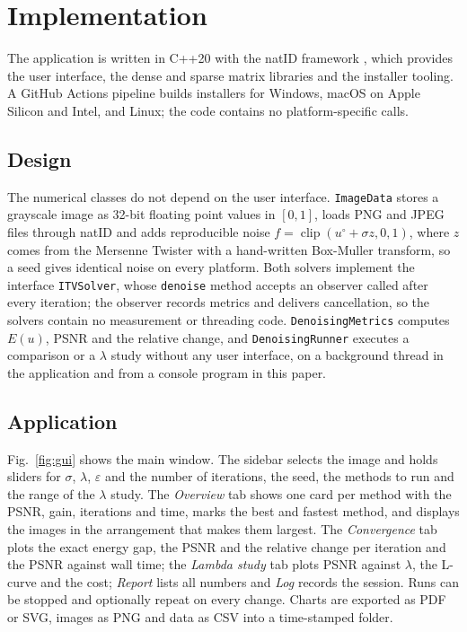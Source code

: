 \documentclass[conference,a4paper]{IEEEtran}
\DeclareMathOperator{\clip}{clip}
\begin{document}
\section{Implementation}\label{sec:impl}

The application is written in C++20 with the natID framework \cite{natid}, which provides the user interface, the dense and sparse matrix libraries and the installer tooling. A GitHub Actions pipeline builds installers for Windows, macOS on Apple Silicon and Intel, and Linux; the code contains no platform-specific calls.

\subsection{Design}

The numerical classes do not depend on the user interface. \texttt{ImageData} stores a grayscale image as 32-bit floating point values in $[0,1]$, loads PNG and JPEG files through natID and adds reproducible noise $f=\clip(u^\circ+\sigma z,0,1)$, where $z$ comes from the Mersenne Twister with a hand-written Box-Muller transform, so a seed gives identical noise on every platform. Both solvers implement the interface \texttt{ITVSolver}, whose \texttt{denoise} method accepts an observer called after every iteration; the observer records metrics and delivers cancellation, so the solvers contain no measurement or threading code. \texttt{DenoisingMetrics} computes $E(u)$, PSNR and the relative change, and \texttt{DenoisingRunner} executes a comparison or a $\lambda$ study without any user interface, on a background thread in the application and from a console program in this paper.

\subsection{Application}

Fig.~\ref{fig:gui} shows the main window. The sidebar selects the image and holds sliders for $\sigma$, $\lambda$, $\varepsilon$ and the number of iterations, the seed, the methods to run and the range of the $\lambda$ study. The \emph{Overview} tab shows one card per method with the PSNR, gain, iterations and time, marks the best and fastest method, and displays the images in the arrangement that makes them largest. The \emph{Convergence} tab plots the exact energy gap, the PSNR and the relative change per iteration and the PSNR against wall time; the \emph{Lambda study} tab plots PSNR against $\lambda$, the L-curve and the cost; \emph{Report} lists all numbers and \emph{Log} records the session. Runs can be stopped and optionally repeat on every change. Charts are exported as PDF or SVG, images as PNG and data as CSV into a time-stamped folder.
\end{document}
